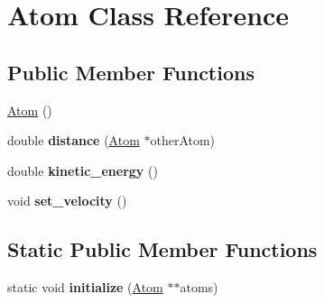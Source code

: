 \hypertarget{class_atom}{}\section{Atom Class Reference}
\label{class_atom}
\subsection*{Public Member Functions}
\begin{DoxyCompactItemize}
\item 
\mbox{\hyperlink{class_atom_aa0147d7e49ab90f559b66e38d3d12863}{Atom}} ()
\item 
\mbox{\label{class_atom_a90a4da89f562cb57f576078e5580a0a8}} 
double {\bfseries distance} (\mbox{\hyperlink{class_atom}{Atom}} $\ast$other\+Atom)
\item 
\mbox{\label{class_atom_a4cc117bd6f7a2ce6f1af407283aff4b2}} 
double {\bfseries kinetic\+\_\+energy} ()
\item 
\mbox{\label{class_atom_a181411015bc90a5e6993ddb006017de9}} 
void {\bfseries set\+\_\+velocity} ()
\end{DoxyCompactItemize}
\subsection*{Static Public Member Functions}
\begin{DoxyCompactItemize}
\item 
\mbox{\label{class_atom_ac711a82c0e5c4ada4cacec38e64c00d7}} 
static void {\bfseries initialize} (\mbox{\hyperlink{class_atom}{Atom}} $\ast$$\ast$atoms)
\end{DoxyCompactItemize}
